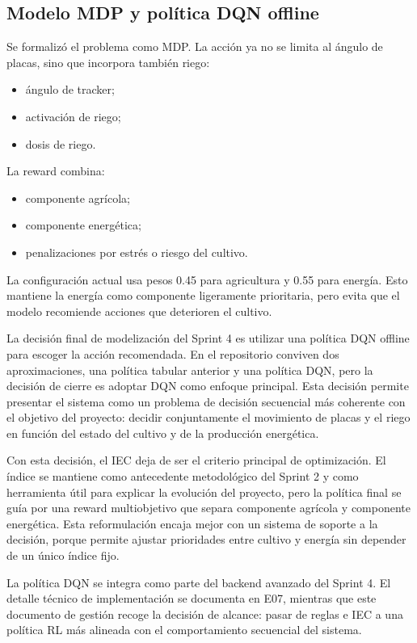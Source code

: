 \documentclass[11pt,a4paper]{article}
\begin{document}
\subsection{Modelo MDP y política DQN offline}

Se formalizó el problema como MDP. La acción ya no se limita al ángulo de placas, sino que incorpora también riego:

\begin{itemize}
    \item ángulo de tracker;
    \item activación de riego;
    \item dosis de riego.
\end{itemize}

La reward combina:

\begin{itemize}
    \item componente agrícola;
    \item componente energética;
    \item penalizaciones por estrés o riesgo del cultivo.
\end{itemize}

La configuración actual usa pesos 0.45 para agricultura y 0.55 para energía. Esto mantiene la energía como componente ligeramente prioritaria, pero evita que el modelo recomiende acciones que deterioren el cultivo.

La decisión final de modelización del Sprint 4 es utilizar una política DQN offline para escoger la acción recomendada. En el repositorio conviven dos aproximaciones, una política tabular anterior y una política DQN, pero la decisión de cierre es adoptar DQN como enfoque principal. Esta decisión permite presentar el sistema como un problema de decisión secuencial más coherente con el objetivo del proyecto: decidir conjuntamente el movimiento de placas y el riego en función del estado del cultivo y de la producción energética.

Con esta decisión, el IEC deja de ser el criterio principal de optimización. El índice se mantiene como antecedente metodológico del Sprint 2 y como herramienta útil para explicar la evolución del proyecto, pero la política final se guía por una reward multiobjetivo que separa componente agrícola y componente energética. Esta reformulación encaja mejor con un sistema de soporte a la decisión, porque permite ajustar prioridades entre cultivo y energía sin depender de un único índice fijo.

La política DQN se integra como parte del backend avanzado del Sprint 4. El detalle técnico de implementación se documenta en E07, mientras que este documento de gestión recoge la decisión de alcance: pasar de reglas e IEC a una política RL más alineada con el comportamiento secuencial del sistema.
\end{document}
